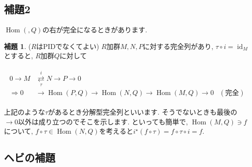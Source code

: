 \documentclass{jsarticle}
\newcommand{\makeop}[1]{\mathop{\mathrm{#1}}\nolimits}
\def\Hom{\makeop{Hom}}
\def\id{\makeop{id}}
\theoremstyle{definition}
\newtheorem{lemma}{補題}
\numberwithin{theorem}{section}
\begin{document}
\subsection{補題2}
$\Hom(, Q)$の右が完全になるときがあります.

\begin{lemma}
($R$はPIDでなくてよい) $R$加群$M, N, P$に対する完全列があり, $\tau\circ i = \id_M$とすると, $R$加群$Q$に対して

\begin{eqnarray*}
\begin{aligned}
0 \rightarrow M &\overset{i}{\underset{\tau}{\rightleftarrows}} N \rightarrow P \rightarrow 0\\
\Rightarrow 0 &\rightarrow \Hom(P, Q) \rightarrow \Hom(N, Q) \rightarrow \Hom(M, Q) \rightarrow 0 &(完全)
\end{aligned}
\end{eqnarray*}
\end{lemma}

上記のような$\tau$があるとき分解型完全列といいます. そうでないときも最後の$\rightarrow 0$以外は成り立つのでそこを示します.
といっても簡単で, $\Hom(M, Q) \ni f$について, $f\circ\tau \in \Hom(N, Q)$を考えると$i^\star(f\circ\tau) = f\circ\tau\circ i = f$.

\subsection{ヘビの補題}
\end{document}
